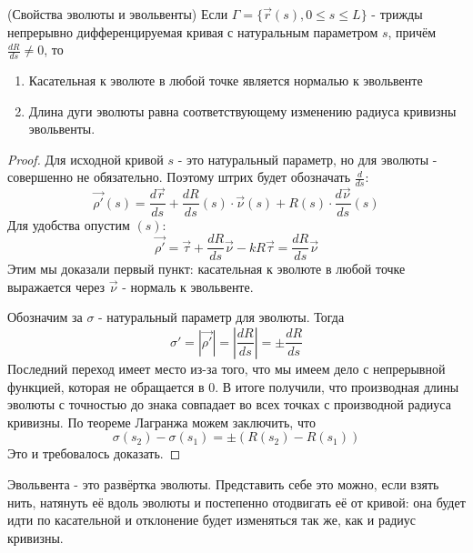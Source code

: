 \begin{theorem} (Свойства эволюты и эвольвенты)
	Если $\Gamma = \{\vec{r}(s), 0 \le s \le L\}$ - трижды непрерывно дифференцируемая кривая с натуральным параметром $s$, причём $\frac{dR}{ds} \neq 0$, то
	\begin{enumerate}
		\item Касательная к эволюте в любой точке является нормалью к эвольвенте
		
		\item Длина дуги эволюты равна соответствующему изменению радиуса кривизны эвольвенты.
	\end{enumerate}
\end{theorem}


\begin{proof}	
	Для исходной кривой $s$ - это натуральный параметр, но для эволюты - совершенно не обязательно. Поэтому штрих будет обозначать $\frac{d}{ds}$:
	\[
		\vec{\rho'}(s) = \frac{d\vec{r}}{ds} + \frac{dR}{ds}(s) \cdot \vec{\nu}(s) + R(s) \cdot \frac{d\vec{\nu}}{ds}(s)
	\]
	Для удобства опустим $(s)$:
	\[
		\vec{\rho'} = \vec{\tau} + \frac{dR}{ds}\vec{\nu} - kR\vec{\tau} = \frac{dR}{ds} \vec{\nu}
	\]
	Этим мы доказали первый пункт: касательная к эволюте в любой точке выражается через $\vec{\nu}$ - нормаль к эвольвенте.
	
	Обозначим за $\sigma$ - натуральный параметр для эволюты. Тогда
	\[
		\sigma' = |\vec{\rho'}| = \left|\frac{dR}{ds}\right| = \pm \frac{dR}{ds}
	\]
	Последний переход имеет место из-за того, что мы имеем дело с непрерывной функцией, которая не обращается в 0. В итоге получили, что производная длины эволюты с точностью до знака совпадает во всех точках с производной радиуса кривизны. По теореме Лагранжа можем заключить, что
	\[
		\sigma(s_2) - \sigma(s_1) = \pm(R(s_2) - R(s_1))
	\]
	Это и требовалось доказать.
\end{proof}

\begin{note}
	Эвольвента - это развёртка эволюты. Представить себе это можно, если взять нить, натянуть её вдоль эволюты и постепенно отодвигать её от кривой: она будет идти по касательной и отклонение будет изменяться так же, как и радиус кривизны.
\end{note}
